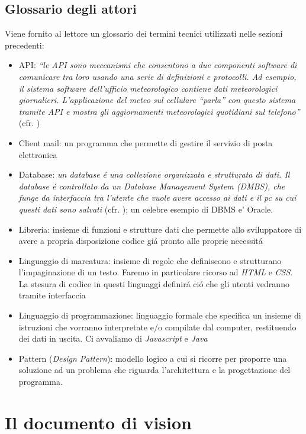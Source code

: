 \documentclass[12pt]{article}
\begin{document}
\subsection{Glossario degli attori}

Viene fornito al lettore un glossario dei termini tecnici utilizzati nelle sezioni precedenti:
\begin{itemize}
	\item API: \textit{``le API sono meccanismi che consentono a due componenti software di comunicare tra loro usando una serie di definizioni e protocolli. Ad esempio, il sistema software dell'ufficio meteorologico contiene dati meteorologici giornalieri. L'applicazione del meteo sul cellulare ``parla'' con questo sistema tramite API e mostra gli aggiornamenti meteorologici quotidiani sul telefono''} (cfr. \cite{bworld})
	\item Client mail: un programma che permette di gestire il servizio di posta elettronica 
	\item Database: \textit{un database \'e una collezione organizzata e strutturata di dati. Il database \'e controllato da un Database Management System (DMBS), che funge da interfaccia tra l'utente che vuole avere accesso ai dati e il pc su cui questi dati sono salvati} (cfr. \cite{database}); un celebre esempio di DBMS e' Oracle. 
	\item Libreria: insieme di funzioni e strutture dati che permette allo sviluppatore di avere a propria disposizione codice gi\'a pronto alle proprie necessit\'a
	\item Linguaggio di marcatura: insieme di regole che definiscono e strutturano l'impaginazione di un testo. Faremo in particolare ricorso ad \textit{HTML} e \textit{CSS}. La stesura di codice in questi linguaggi definir\'a ci\'o che gli utenti vedranno tramite interfaccia
	\item Linguaggio di programmazione: linguaggio formale che specifica un insieme di istruzioni che vorranno interpretate e/o compilate dal computer, restituendo dei dati in uscita. Ci avvaliamo di \textit{Javascript} e \textit{Java}
	\item Pattern (\textit{Design Pattern}): modello logico a cui si ricorre per proporre una soluzione ad un problema che riguarda l'architettura e la progettazione del programma. 
\end{itemize}


\section{Il documento di vision}
\end{document}
